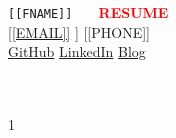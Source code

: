 \begin{center}
    {\fontsize{27}{0}\selectfont
        \texttt{[[FNAME]] \ {\color{gray}{[[LNAME]]}} }
        \textcolor{red}{\cvContactSep \textbf{RESUME}}}\\
    {\fontsize{12}{0}\selectfont
        \href{mailto:[[EMAIL]]}{ [[EMAIL]]}
        \cvContactSpace [[LOCATION]]
        \cvContactSpace {} [[PHONE]]\\
        \href{[[GITHUB]]}{ GitHub}
        \cvContactSpace \href{[[LINKEDIN]]}{ LinkedIn}
        \cvContactSpace \href{[[WEBSITE]]}{ Blog}\\~{\Large \\~\\}}
\end{center}
\vspace{-1.2cm}1